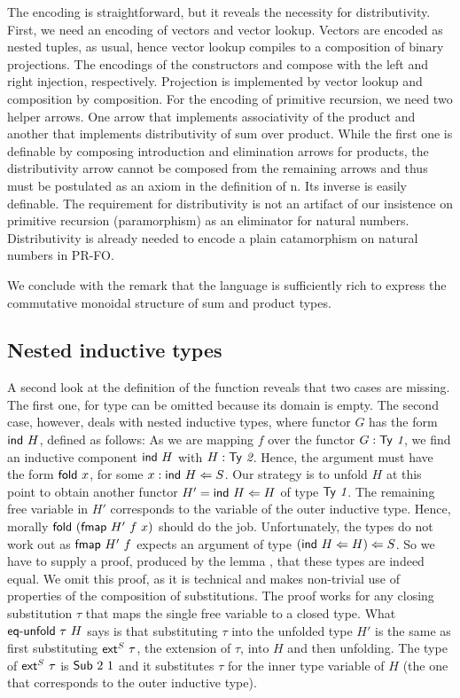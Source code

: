 \documentclass[a4paper,USenglish,cleveref, autoref, thm-restate]{lipics-v2021}
\begin{document}
The encoding is straightforward, but it reveals the necessity for
distributivity. First, we need an 
encoding of vectors and vector lookup. Vectors are encoded as nested
tuples, as usual, hence vector lookup compiles to a composition of
binary projections.
\ccFunMkvec
\ccDefNatToInd
The encodings of the constructors {\ACZ} and {\ACS} compose {\Afold} with the left and right
injection, respectively. Projection is implemented by vector lookup
and composition by composition. For
the encoding of primitive recursion, we need two helper arrows. One
arrow that implements associativity of the product and another that
implements distributivity of sum over product. While the first one is
definable by composing introduction and elimination arrows for
products,  the distributivity arrow cannot be composed from the
remaining arrows and thus must be postulated as an axiom in the
definition of {\APR n}. Its inverse is easily definable.
\ccFunAssocDist
The requirement for distributivity is not an artifact of our
insistence on primitive recursion (paramorphism) as an eliminator for
natural numbers. Distributivity is already needed to encode a plain
catamorphism on natural numbers in PR-FO.

We conclude with the remark that the language is sufficiently rich to
express the commutative monoidal structure of sum and product types.

\subsection{Nested inductive types}
\label{sec:closer-look-at}

A second look at the definition of the {\Afmap} function reveals that
two cases are missing. The first one, for type {\ATZ} can be omitted
because its domain is empty. The second case, however, deals with
nested inductive types, where functor $G$ has the form $\Aind~H$, defined as follows:
\ccFunFmapSignature
\vspace{-1.5\baselineskip}
\ccFunFmapInd
As we are mapping $f$ over the functor $G : \ATy{~1}$, we find an
inductive component $\Aind~H$ with $H : \ATy{~2}$. Hence, the argument
must have the form $\Afold\ x$, for some $x : \Aind~H \Leftarrow S$.
Our strategy is to unfold $H$ at this point to obtain another functor
$H' = \Aind~H \Leftarrow H$ of type $\ATy{~1}$. The remaining free variable in $H'$
corresponds to the variable of the outer inductive type. Hence,
morally $\Afold~ (\Afmap~H'~f~x)$ should do the job. Unfortunately,
the types do not work out as $\Afmap~H'~f$ expects an argument of type
$(\Aind~H \Leftarrow H) \Leftarrow S$. So we have to supply a proof,
produced by the lemma \Aeq, that these types are indeed equal.
\ccEqUnfold
We omit this proof, as it is technical and makes non-trivial
use of properties of the composition of substitutions.
The proof works for any closing substitution $\tau$ that maps the
single free variable to a closed type. What {$\Aeq~\tau~H$} says is 
that substituting $\tau$ into the unfolded type $H'$ is the same as
first substituting $\Aext^S\ \tau$, the extension of $\tau$, into
$H$ and then unfolding. The type of $\Aext^S\ \tau$ is $\ASub~2~1$ and
it substitutes $\tau$ for the inner type variable of $H$ (the one that
corresponds to the outer inductive type). 
\end{document}
